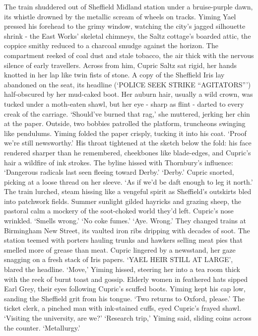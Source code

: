 The train shuddered out of Sheffield Midland station under a bruise-purple dawn, its whistle drowned by the metallic scream of wheels on tracks. Yiming Yael pressed his forehead to the grimy window, watching the city's jagged silhouette shrink - the East Works' skeletal chimneys, the Saltz cottage's boarded attic, the coppice smithy reduced to a charcoal smudge against the horizon. The compartment reeked of coal dust and stale tobacco, the air thick with the nervous silence of early travellers. Across from him, Cupric Saltz sat rigid, her hands knotted in her lap like twin fists of stone. A copy of the Sheffield Iris lay abandoned on the seat, its headline (`POLICE SEEK STRIKE ``AGITATORS''') half-obscured by her mud-caked boot. Her auburn hair, usually a wild crown, was tucked under a moth-eaten shawl, but her eye - sharp as flint - darted to every creak of the carriage.
`Should've burned that rag,' she muttered, jerking her chin at the paper. Outside, two bobbies patrolled the platform, truncheons swinging like pendulums.
Yiming folded the paper crisply, tucking it into his coat. `Proof we're still newsworthy.' His throat tightened at the sketch below the fold: his face rendered sharper than he remembered, cheekbones like blade-edges, and Cupric's hair a wildfire of ink strokes. The byline hissed with Thornbury's influence: `Dangerous radicals last seen fleeing toward Derby.'
`Derby.' Cupric snorted, picking at a loose thread on her sleeve. `As if we'd be daft enough to leg it north.'
The train lurched, steam hissing like a vengeful spirit as Sheffield's outskirts bled into patchwork fields. Summer sunlight gilded hayricks and grazing sheep, the pastoral calm a mockery of the soot-choked world they'd left. Cupric's nose wrinkled. `Smells wrong.'
`No coke fumes.'
`Aye. Wrong.'
They changed trains at Birmingham New Street, its vaulted iron ribs dripping with decades of soot. The station teemed with porters hauling trunks and hawkers selling meat pies that smelled more of grease than meat. Cupric lingered by a newsstand, her gaze snagging on a fresh stack of Iris papers. `YAEL HEIR STILL AT LARGE', blared the headline.
`Move,' Yiming hissed, steering her into a tea room thick with the reek of burnt toast and gossip. Elderly women in feathered hats sipped Earl Grey, their eyes following Cupric's scuffed boots. Yiming kept his cap low, sanding the Sheffield grit from his tongue. `Two returns to Oxford, please.'
The ticket clerk, a pinched man with ink-stained cuffs, eyed Cupric's frayed shawl. `Visiting the university, are we?'
`Research trip,' Yiming said, sliding coins across the counter. `Metallurgy.'
